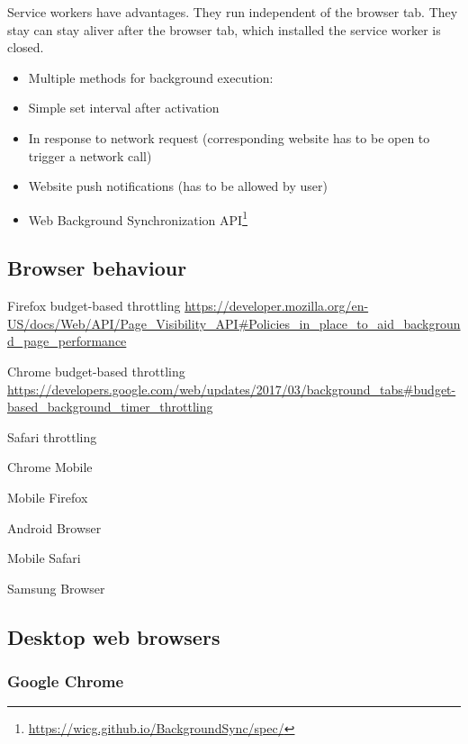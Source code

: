 \documentclass[article,type=bsc,colorback,accentcolor=tud9c]{tudthesis}
\begin{document}
  Service workers have advantages. They run independent of the browser tab. They stay can stay aliver after the browser tab, which installed the service worker is closed.

  \begin{itemize}   
  \item Multiple methods for background execution:

  \item Simple set interval after activation

  \item In response to network request (corresponding website has to be open to trigger a network call)

  \item Website push notifications (has to be allowed by user)

  \item Web Background Synchronization API\footnote{\url{https://wicg.github.io/BackgroundSync/spec/}}
  \end{itemize}

  
  \newpage

  \subsection{Browser behaviour}


  Firefox budget-based throttling
  \url{https://developer.mozilla.org/en-US/docs/Web/API/Page_Visibility_API#Policies_in_place_to_aid_background_page_performance}

  Chrome budget-based throttling
  \url{https://developers.google.com/web/updates/2017/03/background_tabs#budget-based_background_timer_throttling}

  Safari throttling



  Chrome Mobile

  Mobile Firefox

  Android Browser

  Mobile Safari

  Samsung Browser

  
  
  \subsection{Desktop web browsers}

  \subsubsection{Google Chrome}
\end{document}
